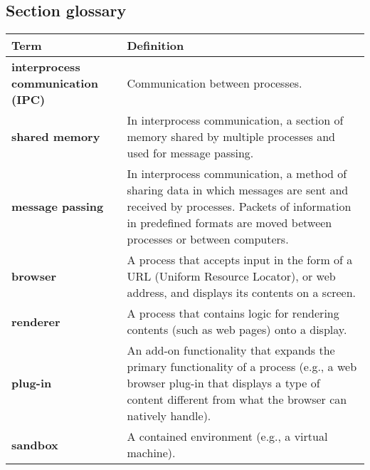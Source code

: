 \subsection*{Section glossary}
\centering
\begin{tabular}{>{\raggedright}p{} >{\raggedright\arraybackslash}p{}}
\toprule
\textbf{Term} & \textbf{Definition} \\
\midrule
\textbf{interprocess communication (IPC)} & Communication between processes. \\
\textbf{shared memory} & In interprocess communication, a section of memory shared by multiple processes and used for message passing. \\
\textbf{message passing} & In interprocess communication, a method of sharing data in which messages are sent and received by processes. Packets of information in predefined formats are moved between processes or between computers. \\
\textbf{browser} & A process that accepts input in the form of a URL (Uniform Resource Locator), or web address, and displays its contents on a screen. \\
\textbf{renderer} & A process that contains logic for rendering contents (such as web pages) onto a display. \\
\textbf{plug-in} & An add-on functionality that expands the primary functionality of a process (e.g., a web browser plug-in that displays a type of content different from what the browser can natively handle). \\
\textbf{sandbox} & A contained environment (e.g., a virtual machine). \\
\bottomrule
\end{tabular}
\vspace{\baselineskip}
